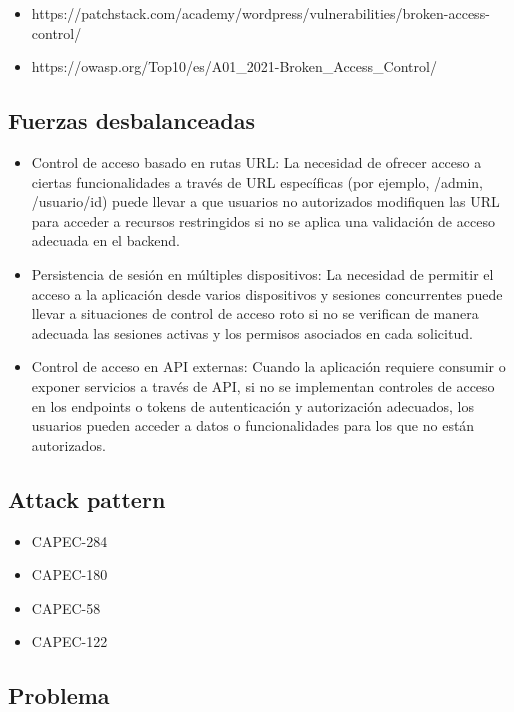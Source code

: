 \begin{itemize}
    \item https://patchstack.com/academy/wordpress/vulnerabilities/broken-access-control/
    \item https://owasp.org/Top10/es/A01\_2021-Broken\_Access\_Control/
\end{itemize}

\subsection*{Fuerzas desbalanceadas}

\begin{itemize} 
    \item Control de acceso basado en rutas URL: La necesidad de ofrecer acceso a ciertas funcionalidades a través de URL específicas (por ejemplo, /admin, /usuario/{id}) puede llevar a que usuarios no autorizados modifiquen las URL para acceder a recursos restringidos si no se aplica una validación de acceso adecuada en el backend.
    \item Persistencia de sesión en múltiples dispositivos: La necesidad de permitir el acceso a la aplicación desde varios dispositivos y sesiones concurrentes puede llevar a situaciones de control de acceso roto si no se verifican de manera adecuada las sesiones activas y los permisos asociados en cada solicitud.
    \item Control de acceso en API externas: Cuando la aplicación requiere consumir o exponer servicios a través de API, si no se implementan controles de acceso en los endpoints o tokens de autenticación y autorización adecuados, los usuarios pueden acceder a datos o funcionalidades para los que no están autorizados.
\end{itemize}

\subsection*{Attack pattern}

\begin{itemize}
    \item CAPEC-284
    \item CAPEC-180
    \item CAPEC-58
    \item CAPEC-122
\end{itemize}


\subsection*{Problema}


